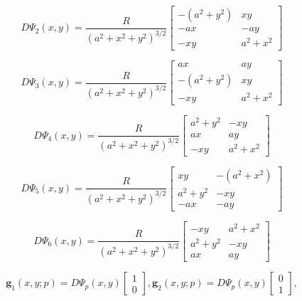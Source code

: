 \begin{equation}
	\label{chp3-eqdistant-dpsi2}
	D\Psi_{2}(x,y) = \frac{R}{{(a^2 + x^2 + y^2)}^{3/2}}
	\begin{bmatrix}
		-(a^2+y^2) & xy \\
		 -ax &  -ay \\
		 -xy &  a^2+x^2
	\end{bmatrix}
\end{equation}

\begin{equation}
	\label{chp3-eqdistant-dpsi3}
	D\Psi_{3}(x,y) = \frac{R}{{(a^2 + x^2 + y^2)}^{3/2}}
	\begin{bmatrix}
		 ax &  ay \\
		-(a^2+y^2) & xy \\
		 -xy &  a^2+x^2
	\end{bmatrix}
\end{equation}

\begin{equation}
	\label{chp3-eqdistant-dpsi4}
	D\Psi_{4}(x,y) = \frac{R}{{(a^2 + x^2 + y^2)}^{3/2}}	
	\begin{bmatrix}
		 a^2+y^2 &  -xy \\
		 ax & ay \\
		 -xy &  a^2+x^2
	\end{bmatrix}
\end{equation}

\begin{equation}
	\label{chp3-eqdistant-dpsi5}
	D\Psi_{5}(x,y) = \frac{R}{{(a^2 + x^2 + y^2)}^{3/2}}	
	\begin{bmatrix}
		 xy  & -(a^2+x^2) \\
	 	 a^2+y^2  &  -xy \\
		-ax & -ay
	\end{bmatrix}
\end{equation}

\begin{equation}
	\label{chp3-eqdistant-dpsi6}
	D\Psi_{6}(x,y) = \frac{R}{{(a^2 + x^2 + y^2)}^{3/2}}
	\begin{bmatrix}
		 -xy  &  a^2+x^2 \\
		 a^2+y^2  &  -xy \\
		 ax &  ay
	\end{bmatrix}
\end{equation}

\begin{equation}
	\boldsymbol{g}_{1}(x,y;p) = D\Psi_{p}(x,y)
	\begin{bmatrix}
		 1 \\
		 0
	\end{bmatrix},
	\boldsymbol{g}_{2}(x,y;p) = D\Psi_{p}(x,y)
	\begin{bmatrix}
		 0 \\
		 1
	\end{bmatrix},
\end{equation}

